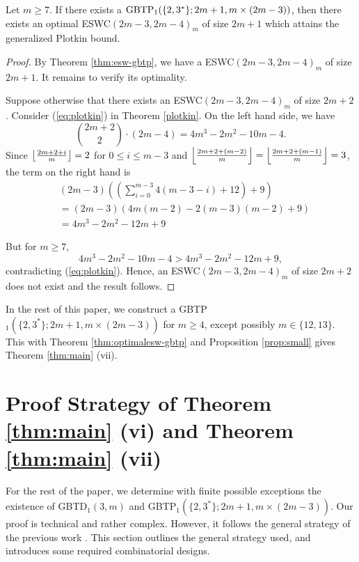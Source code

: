 \documentclass[draft, 11pt]{article}
\begin{document}
 \begin{theorem}
 \label{thm:optimalesw-gbtp} Let $m\ge 7$. If there exists a $\textrm{GBTP}_1(\{2,3^*\};2m+1,m\times (2m-3))$,
 then there exists an optimal ESWC$(2m-3,2m-4)_m$
  of size $2m+1$ which attains the generalized Plotkin bound.
 \end{theorem}
 \begin{proof}
 By Theorem \ref{thm:esw-gbtp}, we have a ESWC$(2m-3,2m-4)_m$ %
 of size $2m+1$. It remains to verify its optimality.

Suppose otherwise that there exists an ESWC$(2m-3,2m-4)_m$ of size
 $2m+2$. Consider (\ref{eq:plotkin}) in Theorem \ref{plotkin}. On the left hand side, we have
 \begin{equation*}
\binom{2m+2}{2} \cdot (2m-4) =4m^3 - 2m^2 - 10m - 4.
 \end{equation*}
 Since $\left\lfloor{\frac{2m+2+i}{m}}\right\rfloor=2$ for $0\le i\le m-3$ and $\left\lfloor{\frac{2m+2+(m-2)}{m}}\right\rfloor=\left\lfloor{\frac{2m+2+(m-1)}{m}}\right\rfloor=3$,
 the term on the right hand is
  \begin{align*}
  &(2m-3)\left(\left(\sum_{i=0}^{m-3}  4(m-3-i)+12\right)+9\right)\\
  &=(2m-3)(4m(m-2)-2(m-3)(m-2)+9)\\
  &=4m^3 - 2m^2 - 12m + 9
  \end{align*}

  But for $m\ge 7$,
  \begin{equation*}
4m^3 - 2m^2 - 10m - 4 > 4m^3 - 2m^2 - 12m + 9,
 \end{equation*}
\noindent contradicting (\ref{eq:plotkin}). Hence, an ESWC$(2m-3,2m-4)_m$
of size  $2m+2$ does not exist and the result follows.
 \end{proof}




In the rest of this paper, 
we construct a GBTP$_1(\{2,3^*\};2m+1,m\times (2m-3))$ for $m\ge 4$, except possibly $m\in\{12,13\}$.
This with Theorem \ref{thm:optimalesw-gbtp} and Proposition \ref{prop:small} gives Theorem \ref{thm:main} (vii).

 

\section{Proof Strategy of Theorem \ref{thm:main} (vi) and Theorem \ref{thm:main} (vii)}
 For the rest of the paper, we %
 determine with finite possible exceptions the existence of
 GBTD$_1(3,m)$ and GBTP$_1(\{2,3^*\};2m+1,m\times (2m-3))$.
 Our proof is technical and rather complex.
 However, it follows the general strategy of the previous work \cite{Lamken:1992,Yinetal:2008,Daietal:2013}.
 This section outlines the general strategy used, and introduces some required
 combinatorial designs.
\end{document}
